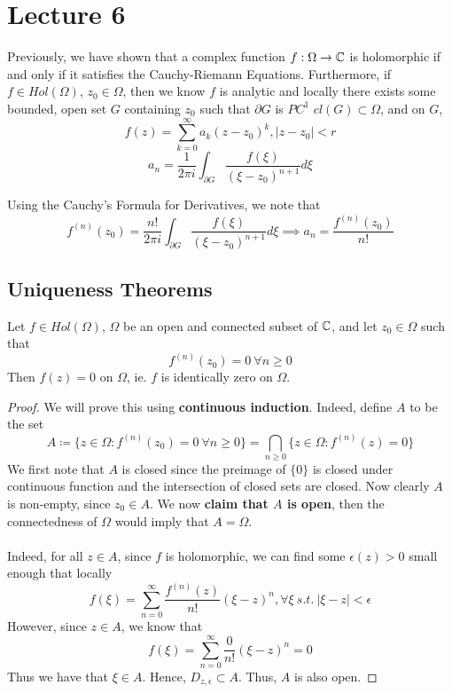 \section{Lecture 6}

Previously, we have shown that a complex function $f: \Omega \to \mathbb{C}$ is holomorphic if and only if it satisfies the Cauchy-Riemann Equations. Furthermore, if $f \in Hol(\Omega)$, $z_0 \in \Omega$, then we know $f$ is analytic and locally there exists some bounded, open set $G$ containing $z_0$ such that $\partial G$ is $PC^1$ $cl(G) \subset \Omega$, and on $G$,
\[f(z) = \sum_{k = 0}^\infty a_k (z - z_0)^k, |z - z_0| < r\]
\[a_n = \frac{1}{2 \pi i} \int_{\partial G} \frac{f(\xi)}{(\xi - z_0)^{n+1}} d\xi\]

\noindent Using the Cauchy's Formula for Derivatives, we note that
\[f^{(n)}(z_0) = \frac{n!}{2 \pi i} \int_{\partial G} \frac{f(\xi)}{(\xi - z_0)^{n+1}} d\xi \implies a_n = \frac{f^{(n)}(z_0)}{n!}\]

\subsection{Uniqueness Theorems}

\begin{theorem}
Let $f \in Hol(\Omega)$, $\Omega$ be an open and connected subset of $\mathbb{C}$, and let $z_0 \in \Omega$ such that
\[f^{(n)}(z_0) = 0\ \forall n \geq 0\]
Then $f(z) = 0$ on $\Omega$, ie. $f$ is identically zero on $\Omega$.
\end{theorem}

\begin{proof}
We will prove this using \textbf{continuous induction}. Indeed, define $A$ to be the set
\[A \coloneqq \{z \in \Omega : f^{(n)}(z_0) = 0\ \forall n \geq 0\} = \bigcap_{n \geq 0} \{z \in \Omega: f^{(n)}(z) = 0\}\]
We first note that $A$ is closed since the preimage of $\{0\}$ is closed under continuous function and the intersection of closed sets are closed. Now clearly $A$ is non-empty, since $z_0 \in A$. We now \textbf{claim that $A$ is open}, then the connectedness of $\Omega$ would imply that $A = \Omega$.\\\\
Indeed, for all $z \in A$, since $f$ is holomorphic, we can find some $\epsilon(z) > 0$ small enough that locally
\[f(\xi) = \sum_{n = 0}^\infty \frac{f^{(n)}(z)}{n!}(\xi - z)^n, \forall \xi\ s.t.\ |\xi - z| < \epsilon\]
However, since $z \in A$, we know that
\[f(\xi) = \sum_{n = 0}^\infty \frac{0}{n!}(\xi - z)^n = 0\]
Thus we have that $\xi \in A$. Hence, $D_{z, \epsilon} \subset A$. Thus, $A$ is also open.
\end{proof}

